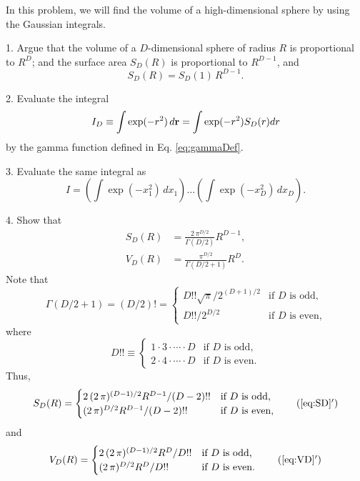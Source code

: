 \documentclass[12pt]{book}
\begin{document}



In this problem, we will find the volume of a high-dimensional sphere
by using the Gaussian integrals.

1. Argue that the volume of a $D$-dimensional sphere of radius $R$ is proportional to
$R^D$; and the surface area $S_D(R)$ is proportional to $R^{D-1}$, and
\[
  S_D(R) = S_D(1) \, R^{D-1}.
\]

2. Evaluate the integral
\[
  I_D \equiv \int \exp(-r^2) \, d\boldsymbol{\mathbf{r}} = \int \exp(-r^2) S_D(r) dr
\]
by the gamma function defined in Eq. \eqref{eq:gammaDef}.

3. Evaluate the same integral as
\[
  I
  =
\left( \int \exp(-x_1^2) \, d x_1 \right)
\dots
\left( \int \exp(-x_D^2) \, d x_D \right).
\]

4. Show that
\begin{align}
  S_D(R) &= \frac{ 2 \, \pi^{D/2} } { \Gamma(D/2) } R^{D-1},
  \label{eq:SD} \\
  V_D(R) &= \frac { \pi^{D/2} } { \Gamma(D/2+1) } R^D.
  \label{eq:VD}
\end{align}
Note that
\begin{equation}
  \Gamma\left( D/2 + 1 \right)
= \left( D/2 \right)!
=
\begin{cases}
  D!! \sqrt{\pi} / 2^{(D+1)/2}  & \mbox{if $D$ is odd,} \\
  D!! / 2^{D/2}                 & \mbox{if $D$ is even,}
\end{cases}
\label{eq:doublefactorial}
\end{equation}
where
\begin{equation}
  D!!
\equiv
\begin{cases}
  1 \cdot 3 \cdot \cdots \cdot D  & \mbox{if $D$ is odd,} \\
  2 \cdot 4 \cdot \cdots \cdot D  & \mbox{if $D$ is even.}
\end{cases}
\end{equation}
%
Thus,
\begin{align}
  S_D(R)
=
\begin{cases}
  2 \, (2 \, \pi)^{(D-1)/2} R^{D-1} / (D-2)!!  & \mbox{if $D$ is odd,} \\
       (2 \, \pi)^{D/2} R^{D-1} / (D-2)!!      & \mbox{if $D$ is even,} \\
\end{cases}
\tag{\ref{eq:SD}$'$}
\label{eq:SDoe}
\end{align}
and
\begin{align}
  V_D(R)
=
\begin{cases}
  2 \, (2 \, \pi)^{(D-1)/2} R^D / D!!  & \mbox{if $D$ is odd,} \\
       (2 \, \pi)^{D/2} R^D / D!!      & \mbox{if $D$ is even.} \\
\end{cases}
\tag{\ref{eq:VD}$'$}
\label{eq:VDoe}
\end{align}
\end{document}
